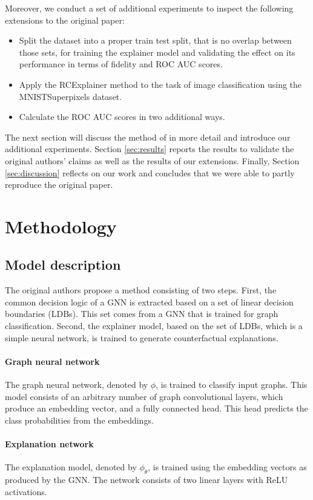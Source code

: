 Moreover, we conduct a set of additional experiments to inspect the following extensions to the original paper:
\begin{itemize}
    \item Split the dataset into a proper train test split, that is no overlap between those sets, for training the explainer model and validating the effect on its performance in terms of fidelity and ROC AUC scores.
    \item Apply the RCExplainer method to the task of image classification using the MNISTSuperpixels dataset.
    \item Calculate the ROC AUC scores in two additional ways.
\end{itemize}

The next section will discuss the method of \citep{bajaj2021robust} in more detail and introduce our additional experiments. Section \ref{sec:results} reports the results to validate the original authors' claims as well as the results of our extensions. Finally, Section \ref{sec:discussion} reflects on our work and concludes that we were able to partly reproduce the original paper. 

\section{Methodology}
\label{section:method}
\subsection{Model description} \label{sec:model_description}
The original authors propose a method consisting of two steps. First, the common decision logic of a GNN is extracted based on a set of linear decision boundaries (LDBs). This set comes from a GNN that is trained for graph classification. Second, the explainer model, based on the set of LDBs, which is a simple neural network, is trained to generate counterfactual explanations.

\paragraph{Graph neural network}
The graph neural network, denoted by $\phi$, is trained to classify input graphs. This model consists of an arbitrary number of graph convolutional layers, which produce an embedding vector, and a fully connected head. This head predicts the class probabilities from the embeddings.

\paragraph{Explanation network}
The explanation model, denoted by $\phi_\theta$, is trained using the embedding vectors as produced by the GNN. The network consists of two linear layers with ReLU activations.


